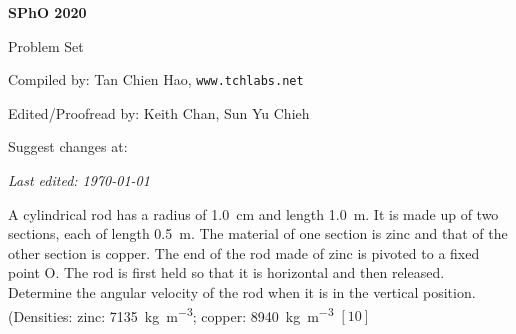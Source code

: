 \def\sphoyear{2020}
\setcounter{section}{0}
\fancyhead[L]{\textbf{SPhO \sphoyear}} 


\begin{titlepage}
\centering

{\Huge\bfseries SPhO \sphoyear}

\vspace{1cm}

{\LARGE Problem Set}

\vspace{2cm}

{\Large Compiled by: Tan Chien Hao, \texttt{www.tchlabs.net}}

\vspace{2cm}

{\Large Edited/Proofread by: Keith Chan, Sun Yu Chieh}

\vspace{2cm}

{\large Suggest changes at: \github}


\vfill

{\itshape Last edited: \today}
\end{titlepage}

\begin{problem}
    A cylindrical rod has a radius of \qty{1.0}{\cm} and length \qty{1.0}{\m}. It is made up of two sections, each of length \qty{0.5}{\m}. The material of one section is zinc and that of the other section is copper. The end of the rod made of zinc is pivoted to a fixed point O. The rod is first held so that it is horizontal and then released. Determine the angular velocity of the rod when it is in the vertical position. (Densities: zinc: \qty{7135}{\kg\m^{-3}}; copper: \qty{8940}{\kg\m^{-3}} \hfill $[10]$
\end{problem}

